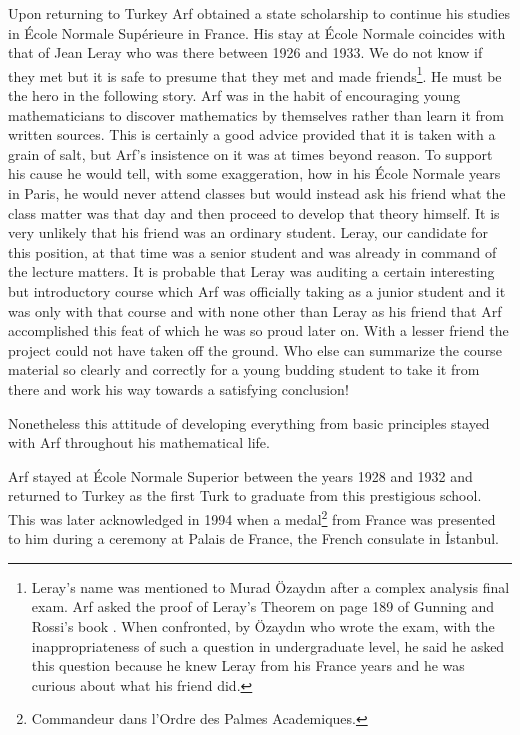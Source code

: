 \documentclass[12pt]{amsart}
\begin{document}
Upon returning to Turkey Arf obtained a state scholarship to continue his studies in \'{E}cole Normale Sup\'{e}rieure  in France. His stay at \'{E}cole Normale  coincides with that of Jean Leray who was there between 1926 and 1933. We do not know if they met but it is safe to presume that they met and made friends\footnote{Leray's name was mentioned to Murad {\"{O}}zayd{\i}n after a complex analysis final exam.
Arf asked the proof of Leray's Theorem  on page 189 of Gunning and Rossi's book \cite{gunning}.
When confronted, by {\"{O}}zayd{\i}n who wrote the exam, with the
inappropriateness of such a question in undergraduate level, he said he asked this question because he knew
Leray from his France years and he was curious about what his friend did.}.  He must be the hero in the following story. Arf was in the habit of encouraging young mathematicians to discover mathematics by themselves rather than learn it from written sources. This is certainly a good advice provided that it is taken with a grain of salt, but Arf's insistence on it was at times beyond reason. To support his cause he would tell, with some exaggeration,  how in his \'{E}cole Normale years in Paris, he would never attend classes but would instead ask his friend what the class matter was that day and then proceed to develop that theory himself. It is very unlikely that his friend was an ordinary student. Leray, our candidate for this position,  at that time was a senior student and was already in command of the lecture matters. It is probable that Leray was auditing a certain interesting but introductory course which Arf was officially taking as a junior student and it was only with that course and with none other than Leray as his friend that Arf accomplished this feat of which he was so proud later on. With a lesser friend the project could not have taken off the ground. Who else can summarize the course material so clearly and correctly for a young budding student to take it from there and work his way towards a satisfying conclusion!

Nonetheless this attitude of developing everything from basic principles stayed with Arf throughout his mathematical life.

Arf stayed at \'{E}cole Normale Superior between the years 1928  and 1932 and returned to Turkey
as the first Turk to graduate from this prestigious
school. This was later acknowledged  in 1994 when a medal\footnote{Commandeur dans l'Ordre des Palmes Academiques.}  from France was presented to him during a ceremony at Palais de France, the French consulate in {\.I}stanbul.
\end{document}
